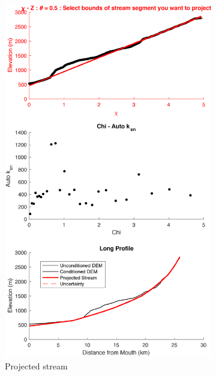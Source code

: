 \begin{figure}[H]
	\centering
	\begin{subfigure}{.5\textwidth}
		\centering
		\includegraphics[width=.8\linewidth]{PNGs/B313_ProjectedProfile_1.png}
		\caption{Projected stream}
		\label{fig:p2sub1}
	\end{subfigure}%
	\begin{subfigure}{.5\textwidth}
		\centering

\end{subfigure}
\end{figure}

